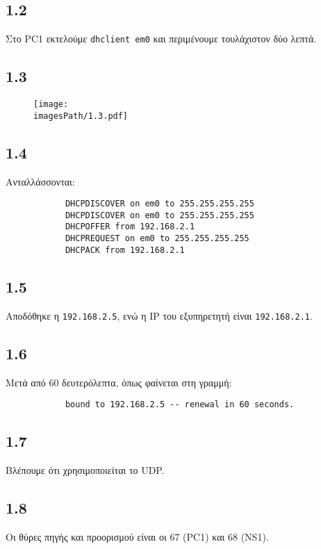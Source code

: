 \documentclass[a4paper, 12pt]{article}
\newcommand{\imagesPath}{.}
\begin{document}
	\subsection*{1.2}
		Στο PC1 εκτελούμε \verb|dhclient em0| και περιμένουμε τουλάχιστον δύο λεπτά.
	
	\subsection*{1.3}
		\begin{figure}[H]
			\begin{center}
				\texttt{[image: \\imagesPath/1.3.pdf]}
			\end{center}
		\end{figure}
		
	\subsection*{1.4}
		Ανταλλάσσονται:
		
		\begin{verbatim}
			DHCPDISCOVER on em0 to 255.255.255.255 
			DHCPDISCOVER on em0 to 255.255.255.255
			DHCPOFFER from 192.168.2.1
			DHCPREQUEST on em0 to 255.255.255.255 
			DHCPACK from 192.168.2.1
		\end{verbatim}
	
	\subsection*{1.5}
		Αποδόθηκε η \verb|192.168.2.5|, ενώ η IP του εξυπηρετητή είναι \verb|192.168.2.1|.
	
	\subsection*{1.6}
		Μετά από 60 δευτερόλεπτα, όπως φαίνεται στη γραμμή:
		
		\begin{verbatim}
			bound to 192.168.2.5 -- renewal in 60 seconds.
		\end{verbatim}
	
	\subsection*{1.7}
		Βλέπουμε ότι χρησιμοποιείται το UDP.
	
	\subsection*{1.8}
		Οι θύρες πηγής και προορισμού είναι οι 67 (PC1) και 68 (NS1).
	
\end{document}
